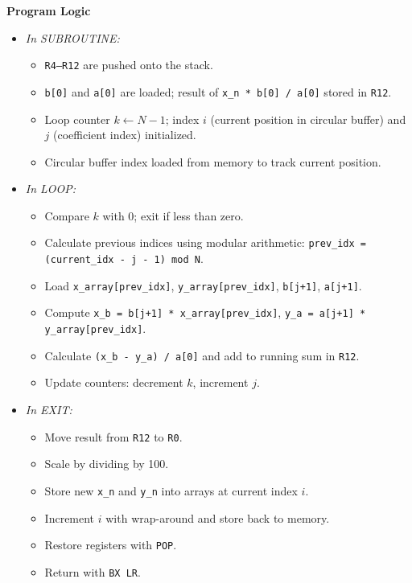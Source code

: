 \documentclass[12pt,a4paper]{article}
\begin{document}
\textbf{Program Logic}
\begin{itemize}
\item \textit{In SUBROUTINE:}
  \begin{itemize}
  \item \texttt{R4--R12} are pushed onto the stack.
  \item \texttt{b[0]} and \texttt{a[0]} are loaded; result of \texttt{x\_n * b[0] / a[0]} stored in \texttt{R12}.
  \item Loop counter $k \gets N-1$; index $i$ (current position in circular buffer) and $j$ (coefficient index) initialized.
  \item Circular buffer index loaded from memory to track current position.
  \end{itemize}

\item \textit{In LOOP:}
  \begin{itemize}
  \item Compare $k$ with 0; exit if less than zero.
  \item Calculate previous indices using modular arithmetic: \texttt{prev\_idx = (current\_idx - j - 1) mod N}.
  \item Load \texttt{x\_array[prev\_idx]}, \texttt{y\_array[prev\_idx]}, \texttt{b[j+1]}, \texttt{a[j+1]}.
  \item Compute \texttt{x\_b = b[j+1] * x\_array[prev\_idx]}, \texttt{y\_a = a[j+1] * y\_array[prev\_idx]}.
  \item Calculate \texttt{(x\_b - y\_a) / a[0]} and add to running sum in \texttt{R12}.
  \item Update counters: decrement $k$, increment $j$.
  \end{itemize}

\item \textit{In EXIT:}
  \begin{itemize}
  \item Move result from \texttt{R12} to \texttt{R0}.
  \item Scale by dividing by 100.
  \item Store new \texttt{x\_n} and \texttt{y\_n} into arrays at current index $i$.
  \item Increment $i$ with wrap-around and store back to memory.
  \item Restore registers with \texttt{POP}.
  \item Return with \texttt{BX LR}.
  \end{itemize}
\end{itemize}
\end{document}
